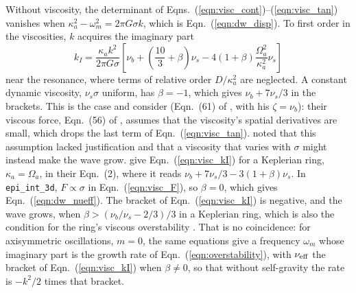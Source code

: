 \documentclass[twocolumn]{aastex702}
\newcommand{\code}[1]{\texttt{#1}}   %
\begin{document}
Without viscosity, the determinant of Eqns.\ (\ref{eqn:visc_cont})--(\ref{eqn:visc_tan}) vanishes when
$\kappa_a^2 - \omega_m^2 = 2\pi G\sigma k$, which is Eqn.\ (\ref{eqn:dw_disp}). To first order in the viscosities,
$k$ acquires the imaginary part
\begin{equation}
    \label{eqn:visc_kI}
    k_I = \frac{\kappa_ak^2}{2\pi G\sigma}\left[\nu_b + \left(\frac{10}{3} + \beta\right)\nu_s
        - 4(1 + \beta)\frac{\Omega_a^2}{\kappa_a^2}\nu_s\right]
\end{equation}
near the resonance, where terms of relative order $D/\kappa_a^2$ are neglected. A constant dynamic viscosity,
$\nu_s\sigma$ uniform, has $\beta = -1$, which gives $\nu_b + 7\nu_s/3$ in the brackets. This is the case
\cite{GT78} and \cite{S84} consider (Eqn.\ (61) of \citealt{S84}, with his $\zeta = \nu_b$): their viscous force,
Eqn.\ (56) of \cite{S84}, assumes that the viscosity's spatial derivatives are small, which drops the last term of
Eqn.\ (\ref{eqn:visc_tan}). \cite{GT78} noted that this assumption lacked justification and that a viscosity that
varies with $\sigma$ might instead make the wave grow. \cite{SCL16} give Eqn.\ (\ref{eqn:visc_kI}) for a Keplerian
ring, $\kappa_a = \Omega_a$, in their Eqn.\ (2), where it reads $\nu_b + 7\nu_s/3 - 3(1 + \beta)\nu_s$. In
\code{epi\_int\_3d}, $F \propto \sigma$ in Eqn.\ (\ref{eqn:visc_F}), so $\beta = 0$, which gives
Eqn.\ (\ref{eqn:dw_nueff}). The bracket of Eqn.\ (\ref{eqn:visc_kI}) is negative, and the wave grows, when
$\beta > (\nu_b/\nu_s - 2/3)/3$ in a Keplerian ring, which is also the condition for the ring's viscous
overstability \citep{ST95, SCL16}. That is no coincidence: for axisymmetric oscillations, $m = 0$, the same
equations give a frequency $\omega_m$ whose imaginary part is the growth rate of Eqn.\ (\ref{eqn:overstability}),
with $\nu_{\rm eff}$ the bracket of Eqn.\ (\ref{eqn:visc_kI}) when $\beta \neq 0$, so that without self-gravity the
rate is $-k^2/2$ times that bracket.

\clearpage
{}
\end{document}
